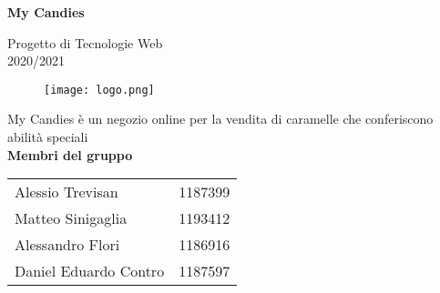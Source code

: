 \begin{titlepage}
   \begin{center}
        \vspace*{1cm}
    
        \vspace{0.3cm}
        \textbf{\huge My Candies}

        \vspace{0.3cm}
        Progetto di Tecnologie Web \\
        \vspace{0.3cm}
        2020/2021
        \vspace{0.3cm}
        \begin{figure}[H]
        \centering
        \texttt{[image: logo.png]}
        \end{figure}
        \vspace{0.3cm}
         My Candies è un negozio online per la vendita di caramelle che conferiscono abilità speciali \\
        \vspace{1.0cm}
        \textbf{Membri del gruppo} \\
        \vspace{1.0cm}
        \begin{tabular}{lc}
        Alessio Trevisan      & 1187399 \\
        Matteo Sinigaglia     & 1193412 \\
        Alessandro Flori      & 1186916 \\
        Daniel Eduardo Contro & 1187597 \\
        \end{tabular} 
        \\
        \vspace{1.0cm}
        

\end{center}
\end{titlepage}
